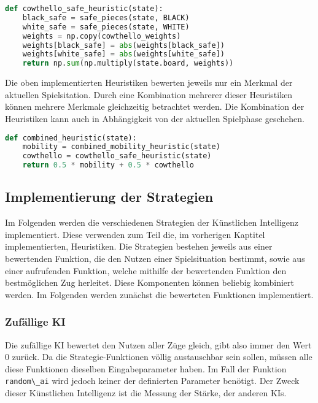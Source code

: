 \begin{lstlisting}[language=Python]
def cowthello_safe_heuristic(state):
    black_safe = safe_pieces(state, BLACK)
    white_safe = safe_pieces(state, WHITE)
    weights = np.copy(cowthello_weights)
    weights[black_safe] = abs(weights[black_safe])
    weights[white_safe] = abs(weights[white_safe])
    return np.sum(np.multiply(state.board, weights))
\end{lstlisting}

Die oben implementierten Heuristiken bewerten jeweils nur ein Merkmal
der aktuellen Spielsitation. Durch eine Kombination mehrerer dieser
Heuristiken können mehrere Merkmale gleichzeitig betrachtet werden. Die
Kombination der Heuristiken kann auch in Abhängigkeit von der aktuellen
Spielphase geschehen.

\begin{lstlisting}[language=Python]
def combined_heuristic(state):
    mobility = combined_mobility_heuristic(state)
    cowthello = cowthello_safe_heuristic(state)
    return 0.5 * mobility + 0.5 * cowthello
\end{lstlisting}

\hypertarget{implementierung-der-strategien}{%
\subsection{Implementierung der
Strategien}\label{implementierung-der-strategien}}

Im Folgenden werden die verschiedenen Strategien der Künstlichen
Intelligenz implementiert. Diese verwenden zum Teil die, im vorherigen
Kaptitel implementierten, Heuristiken. Die Strategien bestehen jeweils
aus einer bewertenden Funktion, die den Nutzen einer Spielsituation
bestimmt, sowie aus einer aufrufenden Funktion, welche mithilfe der
bewertenden Funktion den bestmöglichen Zug herleitet. Diese Komponenten
können beliebig kombiniert werden. Im Folgenden werden zunächst die
bewerteten Funktionen implementiert.

\hypertarget{zufuxe4llige-ki}{%
\subsubsection{Zufällige KI}\label{zufuxe4llige-ki}}

Die zufällige KI bewertet den Nutzen aller Züge gleich, gibt also immer
den Wert \(0\) zurück. Da die Strategie-Funktionen völlig austauschbar
sein sollen, müssen alle diese Funktionen dieselben Eingabeparameter
haben. Im Fall der Funktion \passthrough{\lstinline!random\_ai!} wird
jedoch keiner der definierten Parameter benötigt. Der Zweck dieser
Künstlichen Intelligenz ist die Messung der Stärke, der anderen KIs.

